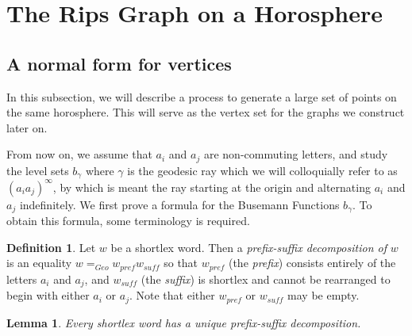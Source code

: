 \documentclass{amsart}
\newtheorem{lemma}[theorem]{Lemma}
\theoremstyle{definition}
\newtheorem{definition}[theorem]{Definition}
\theoremstyle{remark}
\begin{document}
	
	\section{The Rips Graph on a Horosphere}
	\label{sec:RipsGraph}
	
	\subsection{A normal form for vertices}
	\label{subsec:PrefixSuffix}
	In this subsection, we will describe a process to generate a large set of points on the same horosphere. This will serve as the vertex set for the graphs we construct later on.
	
	From now on, we assume that $a_i$ and $a_j$ are non-commuting letters, and study the level sets $b_\gamma$ where $\gamma$ is the geodesic ray which we will colloquially refer to as $(a_ia_j)^\infty$, by which is meant the ray starting at the origin and alternating $a_i$ and $a_j$ indefinitely. We first prove a formula for the Busemann Functions $b_\gamma$. To obtain this formula, some terminology is required.
	
	\begin{definition}
		
		Let $w$ be a shortlex word. Then a \textit{prefix-suffix decomposition of} $w$ is an equality $w=_{Geo}w_{pref}w_{suff}$ so that $w_{pref}$ (the \textit{prefix}) consists entirely of the letters $a_i$ and $a_j$, and $w_{suff}$ (the \textit{suffix}) is shortlex and cannot be rearranged to begin with either $a_i$ or $a_j$. Note that either $w_{pref}$ or $w_{suff}$ may be empty.
		
	\end{definition}
	
	\begin{lemma}
		
		Every shortlex word has a unique prefix-suffix decomposition.
		
	\end{lemma}
	
\end{document}
